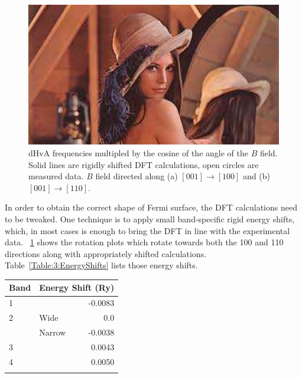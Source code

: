 \begin{figure}[h!]
    \begin{center}
        \includegraphics[scale=0.7]{Misc/TODO}
        \caption{dHvA frequencies multipled by the cosine of the angle of the $B$ field. Solid lines are rigidly shifted DFT calculations, open circles are measured data. $B$ field directed along (a) $[001]\rightarrow[100]$ and (b) $[001]\rightarrow[110]$.}
        \label{Fig:3:ComparisonRotationPlotMeasuredShiftedDFT}
    \end{center}
\end{figure}

In order to obtain the correct shape of Fermi surface, the DFT calculations need to be tweaked. One technique is to apply small band-specific rigid energy shifts, which, in most cases is enough to bring the DFT in line with the experimental data. \fig~\ref{Fig:3:ComparisonRotationPlotMeasuredShiftedDFT} shows the rotation plots which rotate towards both the 100 and 110 directions along with appropriately shifted calculations. Table~\ref{Table:3:EnergyShifts} lists those energy shifts.

\medskip

\begin{center}
    \begin{tabular}[h!]{llr}
\toprule
Band    & \multicolumn{2}{l}{Energy Shift (\unit{Ry})} \\
\midrule
1       &       & -0.0083      \\
2       & Wide  & 0.0          \\
        & Narrow & -0.0038     \\
3       &       & 0.0043       \\
4       &       & 0.0050        \\
\bottomrule
    \label{Table:3:EnergyShifts}
    \end{tabular}
\end{center}

